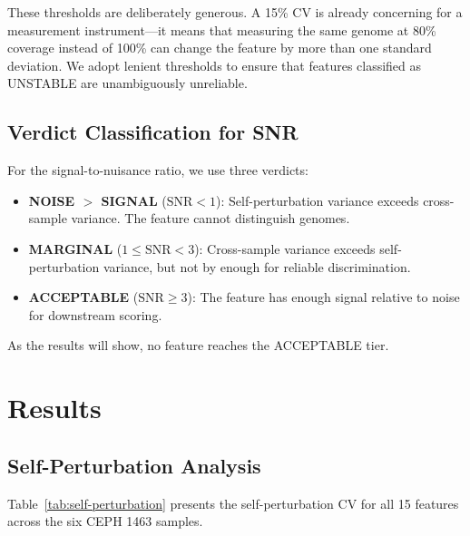 \documentclass{../yalumba}
\begin{document}
These thresholds are deliberately generous.  A 15\% CV is already
concerning for a measurement instrument---it means that measuring the
same genome at 80\% coverage instead of 100\% can change the feature
by more than one standard deviation.  We adopt lenient thresholds to
ensure that features classified as UNSTABLE are unambiguously
unreliable.

\subsection{Verdict Classification for SNR}

For the signal-to-nuisance ratio, we use three verdicts:

\begin{itemize}
  \item \textbf{NOISE $>$ SIGNAL} ($\text{SNR} < 1$): Self-perturbation
    variance exceeds cross-sample variance.  The feature cannot
    distinguish genomes.
  \item \textbf{MARGINAL} ($1 \leq \text{SNR} < 3$): Cross-sample
    variance exceeds self-perturbation variance, but not by enough
    for reliable discrimination.
  \item \textbf{ACCEPTABLE} ($\text{SNR} \geq 3$): The feature has
    enough signal relative to noise for downstream scoring.
\end{itemize}

As the results will show, no feature reaches the ACCEPTABLE tier.


\section{Results}
\label{sec:results}

\subsection{Self-Perturbation Analysis}
\label{sec:self-perturbation}

Table~\ref{tab:self-perturbation} presents the self-perturbation CV
for all 15 features across the six CEPH 1463 samples.
\end{document}
